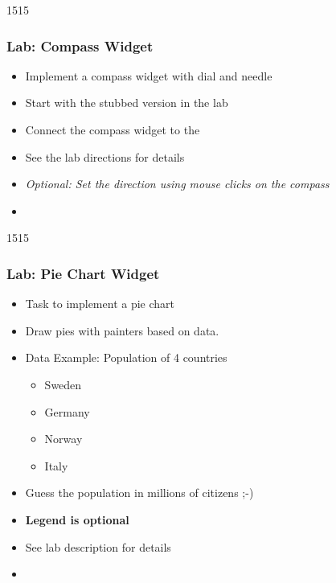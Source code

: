 \begin{slide}{1515}\frametitle{Lab: Compass Widget}
\begin{itemize}
\item Implement a compass widget with dial and needle
\item Start with the stubbed version in the lab
\item Connect the compass widget to the 
\item See the lab directions for details
\item \textit{Optional: Set the direction using mouse clicks on the compass}
\item[] 
\end{itemize}
\end{slide}

\begin{slide}{1515}\frametitle{Lab: Pie Chart Widget}
  \begin{itemize}
  \item Task to implement a pie chart
  \item Draw pies with painters based on data.
  \item Data Example: Population of 4 countries
    \begin{itemize}
    \item Sweden
    \item Germany
    \item Norway
    \item Italy
   \end{itemize}
  \item Guess the population in millions of citizens ;-)
  \item \textbf{Legend is optional}
  \item See lab description for details
  \item[] 
  \end{itemize}
\end{slide}
